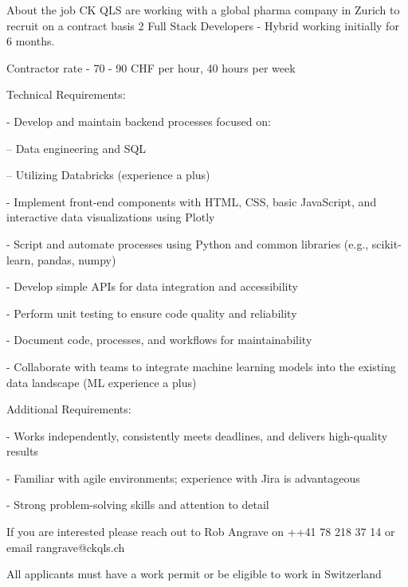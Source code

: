 About the job
CK QLS are working with a global pharma company in Zurich to recruit on a contract basis 2 Full Stack Developers - Hybrid working initially for 6 months.



Contractor rate - 70 - 90 CHF per hour, 40 hours per week 

Technical Requirements:



- Develop and maintain backend processes focused on:

-- Data engineering and SQL

-- Utilizing Databricks (experience a plus)

- Implement front-end components with HTML, CSS, basic JavaScript, and interactive data visualizations using Plotly

- Script and automate processes using Python and common libraries (e.g., scikit-learn, pandas, numpy)

- Develop simple APIs for data integration and accessibility

- Perform unit testing to ensure code quality and reliability

- Document code, processes, and workflows for maintainability

- Collaborate with teams to integrate machine learning models into the existing data landscape (ML experience a plus)



Additional Requirements:

- Works independently, consistently meets deadlines, and delivers high-quality results

- Familiar with agile environments; experience with Jira is advantageous

- Strong problem-solving skills and attention to detail



If you are interested please reach out to Rob Angrave on ++41 78 218 37 14 or email rangrave@ckqls.ch



All applicants must have a work permit or be eligible to work in Switzerland


